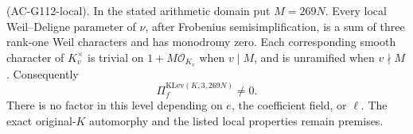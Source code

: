 \begin{proposition}
\label{prop:G112-local}
\textnormal{(AC-G112-local).}
In the stated arithmetic domain put \(M=269N\).  Every local
Weil--Deligne parameter of \(\nu\), after Frobenius semisimplification,
is a sum of three rank-one Weil characters and has monodromy zero.
Each corresponding smooth character of \(K_v^\times\) is trivial on
\(1+M\mathcal O_{K_v}\) when \(v\mid M\), and is unramified when
\(v\nmid M\).  Consequently
\[
                  \Pi_f^{\mathrm{KLev}(K,3,269N)}\ne0.
                  \tag{G112.4}
\]
There is no factor in this level depending on \(e\), the coefficient
field, or \(\ell\).  The exact original-\(K\) automorphy and the listed
local properties remain premises.
\end{proposition}

